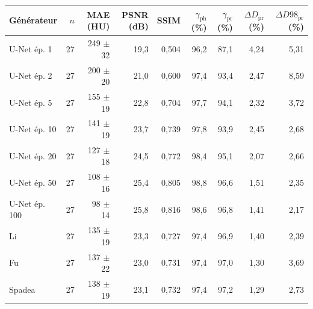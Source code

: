 \begin{tabular}{lrrrrrrrr}
\toprule
Générateur & $n$ & MAE (HU) & PSNR (dB) & SSIM & $\gamma_\text{ph}$ (\%) & $\gamma_\text{pr}$ (\%) & $\Delta D_\text{pr}$ (\%) & $\Delta D98_\text{pr}$ (\%) \\
\midrule
U-Net ép. 1 & 27 & 249 $\pm$ 32 & 19,3 & 0,504 & 96,2 & 87,1 & 4,24 & 5,31 \\
U-Net ép. 2 & 27 & 200 $\pm$ 20 & 21,0 & 0,600 & 97,4 & 93,4 & 2,47 & 8,59 \\
U-Net ép. 5 & 27 & 155 $\pm$ 19 & 22,8 & 0,704 & 97,7 & 94,1 & 2,32 & 3,72 \\
U-Net ép. 10 & 27 & 141 $\pm$ 19 & 23,7 & 0,739 & 97,8 & 93,9 & 2,45 & 2,68 \\
U-Net ép. 20 & 27 & 127 $\pm$ 18 & 24,5 & 0,772 & 98,4 & 95,1 & 2,07 & 2,66 \\
U-Net ép. 50 & 27 & 108 $\pm$ 16 & 25,4 & 0,805 & 98,8 & 96,6 & 1,51 & 2,35 \\
U-Net ép. 100 & 27 & 98 $\pm$ 14 & 25,8 & 0,816 & 98,6 & 96,8 & 1,41 & 2,17 \\
\midrule
Li & 27 & 135 $\pm$ 19 & 23,3 & 0,727 & 97,4 & 96,9 & 1,40 & 2,39 \\
Fu & 27 & 137 $\pm$ 22 & 23,0 & 0,731 & 97,4 & 97,0 & 1,30 & 3,69 \\
Spadea & 27 & 138 $\pm$ 19 & 23,1 & 0,732 & 97,4 & 97,2 & 1,29 & 2,73 \\
\bottomrule
\end{tabular}
